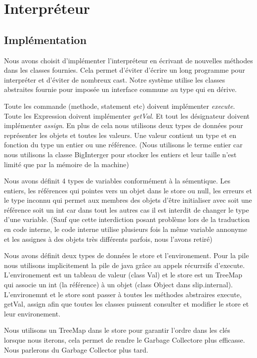 \chapter{Interpréteur}
\section{Implémentation}
Nous avons choisit d'implémenter l'interpréteur en écrivant de nouvelles méthodes dans les classes fournies. Cela permet d'éviter d'écrire un long programme pour interpréter et d'éviter de nombreux cast. Notre système utilise les classes abstraites fournie pour imposée un interface commune au type qui en dérive. 

Toute les commande (methode, statement etc) doivent implémenter \textit{execute}. 
Toute les Expression doivent implémenter \textit{getVal}.
Et tout les désignateur doivent implémenter \textit{assign}.
En plus de cela nous utilisons deux types de données pour représenter les objets et toutes les valeurs. 
Une valeur contient un type et en fonction du type un entier ou une référence.
(Nous utilisons le terme entier car nous utilisons la classe BigInterger pour stocker les entiers et leur taille n'est limité que par la mémoire de la machine)

Nous avons définit 4 types de variables conformément à la sémentique. 
Les entiers, les références qui pointes vers un objet dans le store ou null, les erreurs et le type inconnu qui permet aux membres des objets d'être initialiser avec soit une référence soit un int car dans tout les autres cas il est interdit de changer le type d'une variable. (Sauf que cette interdiction posant problème lors de la traduction en code interne, le code interne utilise plusieurs fois la même variable annonyme et les assignes à des objets très différents parfois, nous l'avons retiré) 


Nous avons définit deux types de données le store et l'environement. Pour la pile nous utilisons implicitement la pile de java grâce au appels récurrsifs d'execute. L'environement est un tableau de valeur (class Val) et le store est un TreeMap qui associe un int (la référence) à un objet (class Object dans slip.internal). L'environemnt et le store sont passer à toutes les méthodes abstraires execute, getVal, assign afin que toutes les classes puissent consulter et modifier le store et leur environement.

Nous utilisons un TreeMap dans le store pour garantir l'ordre dans les clés lorsque nous iterons, cela permet de rendre le Garbage Collectore plus efficasse. Nous parlerons du Garbage Collector plus tard.

